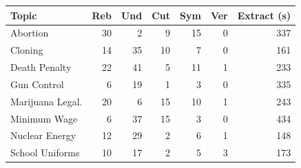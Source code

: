 \begin{tabular}{lrrrrrr}
  \toprule
  Topic & Reb & Und & Cut & Sym & Ver & Extract (s) \\
  \midrule
  Abortion          & 30 & 2 & 9 & 15 & 0 & 337 \\
  Cloning           & 14 & 35 & 10 & 7 & 0 & 161 \\
  Death Penalty     & 22 & 41 & 5 & 11 & 1 & 233 \\
  Gun Control       & 6 & 19 & 1 & 3 & 0 & 335 \\
  Marijuana Legal.  & 20 & 6 & 15 & 10 & 1 & 243 \\
  Minimum Wage      & 6 & 37 & 15 & 3 & 0 & 434 \\
  Nuclear Energy    & 12 & 29 & 2 & 6 & 1 & 148 \\
  School Uniforms   & 10 & 17 & 2 & 5 & 3 & 173 \\
  \bottomrule
\end{tabular}

